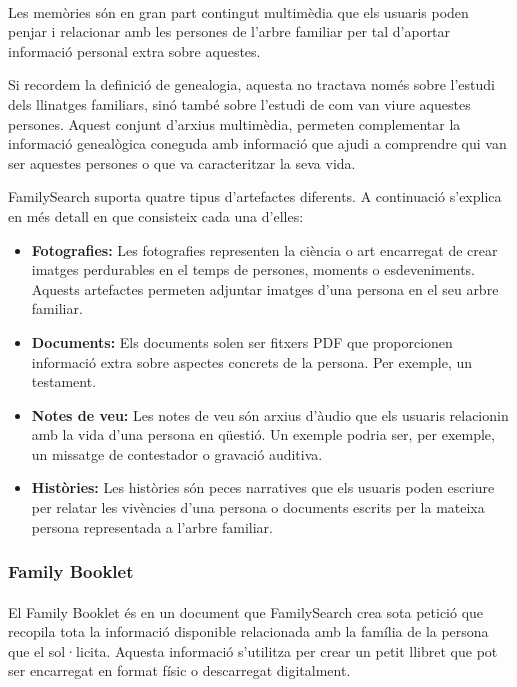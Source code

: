     \paragraph{}
    Les memòries són en gran part contingut multimèdia que els usuaris poden penjar i relacionar amb les persones de l'arbre familiar per tal d'aportar informació personal extra sobre aquestes.

    Si recordem la definició de genealogia, aquesta no tractava només sobre l'estudi dels llinatges familiars, sinó també sobre l'estudi de com van viure aquestes persones. Aquest conjunt d'arxius multimèdia, permeten complementar la informació genealògica coneguda amb informació que ajudi a comprendre qui van ser aquestes persones o que va caracteritzar la seva vida.

    FamilySearch suporta quatre tipus d'artefactes diferents. A continuació s'explica en més detall en que consisteix cada una d'elles:

    \begin{itemize}
        \item \textbf{Fotografies:} Les fotografies representen la ciència o art encarregat de crear imatges perdurables en el temps de persones, moments o esdeveniments. Aquests artefactes permeten adjuntar imatges d'una persona en el seu arbre familiar.
        \item \textbf{Documents:} Els documents solen ser fitxers PDF que proporcionen informació extra sobre aspectes concrets de la persona. Per exemple, un testament.
        \item \textbf{Notes de veu:} Les notes de veu són arxius d’àudio que els usuaris relacionin amb la vida d’una persona en qüestió. Un exemple podria ser, per exemple, un missatge de contestador o gravació auditiva.
        \item \textbf{Històries:} Les històries són peces narratives que els usuaris poden escriure per relatar les vivències d'una persona o documents escrits per la mateixa persona representada a l'arbre familiar.
    \end{itemize}


    \subsubsection{Family Booklet}

    \paragraph{}
    El Family Booklet és en un document que FamilySearch crea sota petició que recopila tota la informació disponible relacionada amb la família de la persona que el sol·licita. Aquesta informació s'utilitza per crear un petit llibret que pot ser encarregat en format físic o descarregat digitalment.
